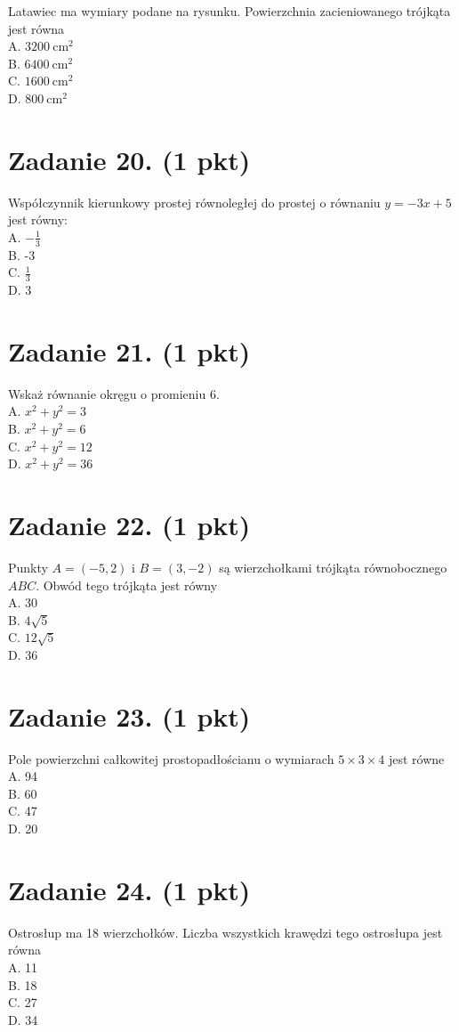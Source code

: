 \documentclass[10pt]{article}
\begin{document}
Latawiec ma wymiary podane na rysunku. Powierzchnia zacieniowanego trójkąta jest równa\\
A. \(3200 \mathrm{~cm}^{2}\)\\
B. \(6400 \mathrm{~cm}^{2}\)\\
C. \(1600 \mathrm{~cm}^{2}\)\\
D. \(800 \mathrm{~cm}^{2}\)

\section*{Zadanie 20. (1 pkt)}
Współczynnik kierunkowy prostej równoległej do prostej o równaniu \(y=-3 x+5\) jest równy:\\
A. \(-\frac{1}{3}\)\\
B. -3\\
C. \(\frac{1}{3}\)\\
D. 3

\section*{Zadanie 21. (1 pkt)}
Wskaż równanie okręgu o promieniu 6.\\
A. \(x^{2}+y^{2}=3\)\\
B. \(x^{2}+y^{2}=6\)\\
C. \(x^{2}+y^{2}=12\)\\
D. \(x^{2}+y^{2}=36\)

\section*{Zadanie 22. (1 pkt)}
Punkty \(A=(-5,2)\) i \(B=(3,-2)\) są wierzchołkami trójkąta równobocznego \(A B C\). Obwód tego trójkąta jest równy\\
A. 30\\
B. \(4 \sqrt{5}\)\\
C. \(12 \sqrt{5}\)\\
D. 36

\section*{Zadanie 23. (1 pkt)}
Pole powierzchni całkowitej prostopadłościanu o wymiarach \(5 \times 3 \times 4\) jest równe\\
A. 94\\
B. 60\\
C. 47\\
D. 20

\section*{Zadanie 24. (1 pkt)}
Ostrosłup ma 18 wierzchołków. Liczba wszystkich krawędzi tego ostrosłupa jest równa\\
A. 11\\
B. 18\\
C. 27\\
D. 34
\end{document}
